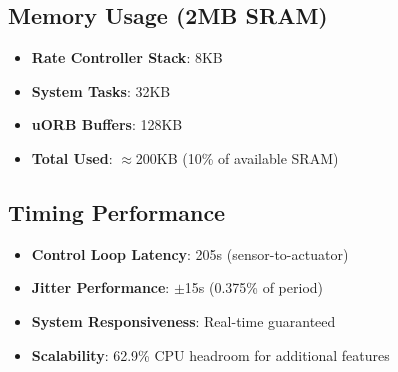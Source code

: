 \documentclass[landscape,a4paper]{article}
\begin{document}
\begin{tcolorbox}[colback=px4blue!5,colframe=px4blue,width=\textwidth,arc=2mm,boxrule=1.5pt]
\subsection{Memory Usage (2MB SRAM)}
\begin{itemize}
    \item \textbf{Rate Controller Stack}: 8KB
    \item \textbf{System Tasks}: 32KB
    \item \textbf{uORB Buffers}: 128KB
    \item \textbf{Total Used}: $\approx$200KB (10\% of available SRAM)
\end{itemize}

\subsection{Timing Performance}
\begin{itemize}
    \item \textbf{Control Loop Latency}: 205\textmu s (sensor-to-actuator)
    \item \textbf{Jitter Performance}: $\pm$15\textmu s (0.375\% of period)
    \item \textbf{System Responsiveness}: Real-time guaranteed
    \item \textbf{Scalability}: 62.9\% CPU headroom for additional features
\end{itemize}
\end{tcolorbox}
\end{document}
